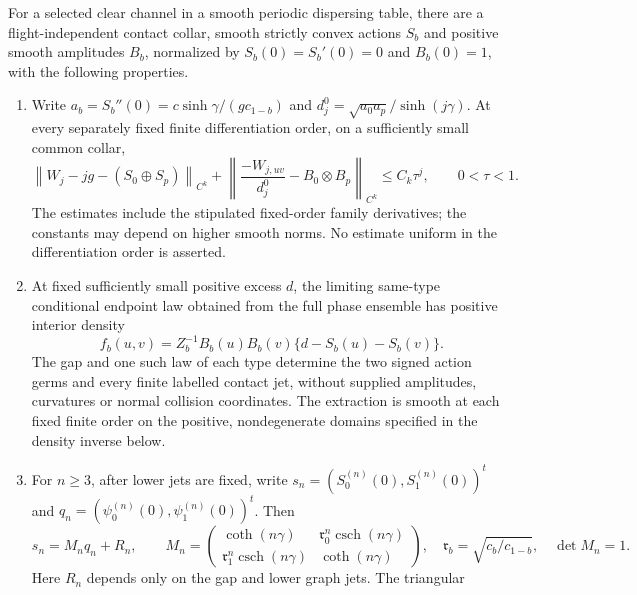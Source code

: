 \begin{theorem}
\label{thm:v56-local-mechanism}
For a selected clear channel in a smooth periodic dispersing table,
there are a flight-independent contact collar, smooth strictly convex
actions $S_b$ and positive smooth amplitudes $B_b$, normalized by
$S_b(0)=S_b'(0)=0$ and $B_b(0)=1$, with the following properties.
\begin{enumerate}
\item Write $a_b=S_b''(0)=c\sinh\gamma/(gc_{1-b})$ and
$d_j^0=\sqrt{a_0a_p}/\sinh(j\gamma)$.  At every separately fixed
finite differentiation order, on a sufficiently small common collar,
\begin{equation}\label{eq:v56-local-relative}
 \left\|W_j-jg-(S_0\oplus S_p)\right\|_{C^k}
 +\left\|\frac{-W_{j,uv}}{d_j^0}-B_0\otimes B_p\right\|_{C^k}
                         \le C_k\tau^j,\qquad 0<\tau<1.
\end{equation}
The estimates include the stipulated fixed-order family derivatives;
the constants may depend on higher smooth norms.  No estimate uniform
in the differentiation order is asserted.
\item At fixed sufficiently small positive excess $d$, the limiting same-type
conditional endpoint law obtained from the full phase ensemble has
positive interior density
\begin{equation}\label{eq:v56-local-density}
 f_b(u,v)=Z_b^{-1}B_b(u)B_b(v)\{d-S_b(u)-S_b(v)\}.
\end{equation}
The gap and one such law of each type determine the two signed action
germs and every finite labelled contact jet, without supplied amplitudes,
curvatures or normal collision coordinates.  The extraction is smooth at
each fixed finite order on the positive, nondegenerate domains specified
in the density inverse below.
\item For $n\ge3$, after lower jets are fixed, write
$s_n=(S_0^{(n)}(0),S_1^{(n)}(0))^t$ and
$q_n=(\psi_0^{(n)}(0),\psi_1^{(n)}(0))^t$.  Then
\begin{equation}\label{eq:v56-local-block}
 s_n=M_nq_n+R_n,\qquad
 M_n=\begin{pmatrix}
 \coth(n\gamma)&\mathfrak r_0^n\operatorname{csch}(n\gamma)\\
 \mathfrak r_1^n\operatorname{csch}(n\gamma)&\coth(n\gamma)
 \end{pmatrix},\quad
 \mathfrak r_b=\sqrt{c_b/c_{1-b}},\quad \det M_n=1.
\end{equation}
Here $R_n$ depends only on the gap and lower graph jets.  The triangular

\end{enumerate}
\end{theorem}
